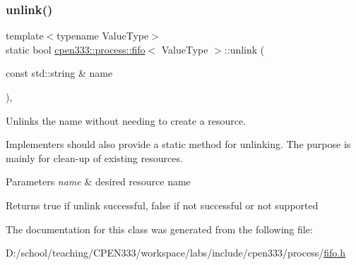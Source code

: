 \subsubsection{\texorpdfstring{unlink()}{unlink()}\hspace{0.1cm}{\footnotesize\ttfamily [2/2]}}
{\footnotesize\ttfamily template$<$typename Value\+Type$>$ \\
static bool \hyperlink{classcpen333_1_1process_1_1fifo}{cpen333\+::process\+::fifo}$<$ Value\+Type $>$\+::unlink (\begin{DoxyParamCaption}\item[{const std\+::string \&}]{name }\end{DoxyParamCaption})\hspace{0.3cm}{\ttfamily [inline]}, {\ttfamily [static]}}



Unlinks the name without needing to create a resource. 

Implementers should also provide a static method for unlinking. The purpose is mainly for clean-\/up of existing resources.


\begin{DoxyParams}{Parameters}
{\em name} & desired resource name \\
\hline
\end{DoxyParams}
\begin{DoxyReturn}{Returns}
{\ttfamily true} if unlink successful, {\ttfamily false} if not successful or not supported 
\end{DoxyReturn}


The documentation for this class was generated from the following file\+:\begin{DoxyCompactItemize}
\item 
D\+:/school/teaching/\+C\+P\+E\+N333/workspace/labs/include/cpen333/process/\hyperlink{process_2fifo_8h}{fifo.\+h}\end{DoxyCompactItemize}
